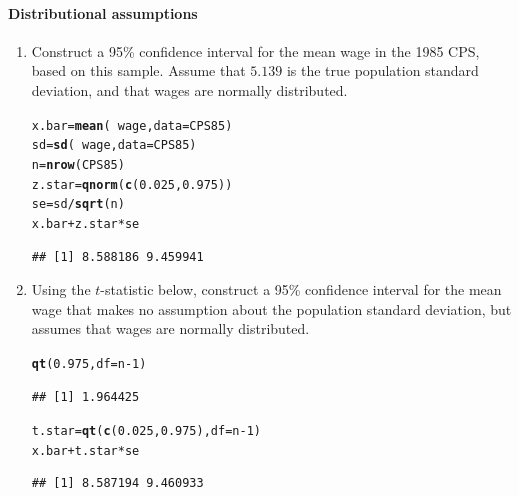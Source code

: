 \documentclass[10pt]{article}\usepackage[]{graphicx}\usepackage[]{color}
\makeatletter
\newcommand{\hlnum}[1]{\textcolor[rgb]{0.686,0.059,0.569}{#1}}%
\newcommand{\hlopt}[1]{\textcolor[rgb]{0,0,0}{#1}}%
\newcommand{\hlstd}[1]{\textcolor[rgb]{0.345,0.345,0.345}{#1}}%
\newcommand{\hlkwb}[1]{\textcolor[rgb]{0.69,0.353,0.396}{#1}}%
\newcommand{\hlkwc}[1]{\textcolor[rgb]{0.333,0.667,0.333}{#1}}%
\newcommand{\hlkwd}[1]{\textcolor[rgb]{0.737,0.353,0.396}{\textbf{#1}}}%
\newenvironment{kframe}{%
 \def\at@end@of@kframe{}%
 \ifinner\ifhmode%
  \def\at@end@of@kframe{\end{minipage}}%
  \begin{minipage}{\columnwidth}%
 \fi\fi%
 \def\FrameCommand##1{\hskip\@totalleftmargin \hskip-\fboxsep
 \colorbox{shadecolor}{##1}\hskip-\fboxsep
     \hskip-\linewidth \hskip-\@totalleftmargin \hskip\columnwidth}%
 \MakeFramed {\advance\hsize-\width
   \@totalleftmargin\z@ \linewidth\hsize
   \@setminipage}}%
 {\par\unskip\endMakeFramed%
 \at@end@of@kframe}
\newenvironment{knitrout}{}{} %
\makeatother
\begin{document}
\paragraph{Distributional assumptions}
\begin{enumerate}
\item Construct a 95\% confidence interval for the mean wage in the 1985 CPS, based on this sample. Assume that $5.139$ is the true population standard deviation, and that wages are normally distributed.
\begin{knitrout}\footnotesize
{}\color{fgcolor}\begin{kframe}
\begin{alltt}
\hlstd{x.bar} \hlkwb{=} \hlkwd{mean}\hlstd{(}\hlopt{~}\hlstd{wage,} \hlkwc{data}\hlstd{=CPS85)}
\hlstd{sd} \hlkwb{=} \hlkwd{sd}\hlstd{(}\hlopt{~}\hlstd{wage,} \hlkwc{data}\hlstd{=CPS85)}
\hlstd{n} \hlkwb{=} \hlkwd{nrow}\hlstd{(CPS85)}
\hlstd{z.star} \hlkwb{=} \hlkwd{qnorm}\hlstd{(}\hlkwd{c}\hlstd{(}\hlnum{0.025}\hlstd{,} \hlnum{0.975}\hlstd{))}
\hlstd{se} \hlkwb{=} \hlstd{sd} \hlopt{/} \hlkwd{sqrt}\hlstd{(n)}
\hlstd{x.bar} \hlopt{+} \hlstd{z.star} \hlopt{*} \hlstd{se}
\end{alltt}
\begin{verbatim}
## [1] 8.588186 9.459941
\end{verbatim}
\end{kframe}
\end{knitrout}
  
  \item Using the $t$-statistic below, construct a 95\% confidence interval for the mean wage that makes no assumption about the population standard deviation, but assumes that wages are normally distributed.

\begin{knitrout}\footnotesize
{}\color{fgcolor}\begin{kframe}
\begin{alltt}
\hlkwd{qt}\hlstd{(}\hlnum{0.975}\hlstd{,} \hlkwc{df} \hlstd{= n}\hlopt{-}\hlnum{1}\hlstd{)}
\end{alltt}
\begin{verbatim}
## [1] 1.964425
\end{verbatim}
\begin{alltt}
\hlstd{t.star} \hlkwb{=} \hlkwd{qt}\hlstd{(}\hlkwd{c}\hlstd{(}\hlnum{0.025}\hlstd{,} \hlnum{0.975}\hlstd{),} \hlkwc{df}\hlstd{=n}\hlopt{-}\hlnum{1}\hlstd{)}
\hlstd{x.bar} \hlopt{+} \hlstd{t.star} \hlopt{*} \hlstd{se}
\end{alltt}
\begin{verbatim}
## [1] 8.587194 9.460933
\end{verbatim}
\end{kframe}
\end{knitrout}


\end{enumerate}
\end{document}
